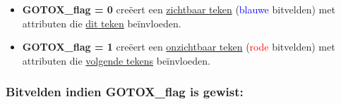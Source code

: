 \begin{itemize}
  \item \textbf{GOTOX\_flag = 0} creëert een \underline{zichtbaar teken} (\textcolor{blue}{blauwe} bitvelden) met attributen die \underline{dit teken} beïnvloeden.  \item \textbf{GOTOX\_flag = 1} creëert een \underline{onzichtbaar teken} (\textcolor{red}{rode} bitvelden) met attributen die \underline{volgende tekens} beïnvloeden.
\end{itemize}


\clearpage
\ifodd\value{page}\hbox{}\newpage\fi
\subsubsection{Bitvelden indien GOTOX\_flag is gewist:}

